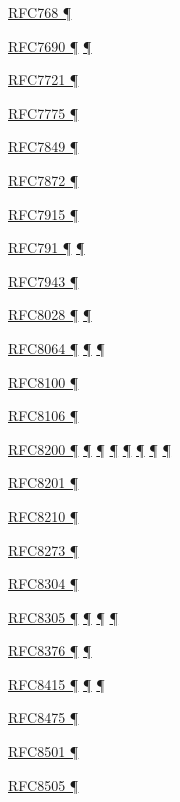\documentclass[
]{article}
\begin{document}
\hyperref[transport-protocols]{RFC768 ¶}

\hyperref[extension-headers-and-options]{RFC7690 ¶}
\hyperref[packet-size-and-jumbo-frames]{¶}

\hyperref[security-operation]{RFC7721 ¶}

\hyperref[routing]{RFC7775 ¶}

\hyperref[layer-2-considerations]{RFC7849 ¶}

\hyperref[extension-headers-and-options]{RFC7872 ¶}

\hyperref[translation-and-ipv4-as-a-service]{RFC7915 ¶}

\hyperref[why-version-6]{RFC791 ¶}
\hyperref[traffic-class-and-flow-label]{¶}

\hyperref[security-operation]{RFC7943 ¶}

\hyperref[auto-configuration]{RFC8028 ¶}
\hyperref[multi-prefix-operation]{¶}

\hyperref[addresses]{RFC8064 ¶} \hyperref[auto-configuration]{¶}
\hyperref[layer-2-functions]{¶}

\hyperref[traffic-class-and-flow-label]{RFC8100 ¶}

\hyperref[auto-configuration]{RFC8106 ¶}

\hyperref[how-to-keep-up-to-date]{RFC8200 ¶}
\hyperref[ipv6-basic-technology]{¶} \hyperref[address-resolution]{¶}
\hyperref[extension-headers-and-options]{¶} \hyperref[packet-format]{¶}
\hyperref[filtering]{¶} \hyperref[further-reading]{¶}
\hyperref[markdown-usage]{¶}

\hyperref[packet-size-and-jumbo-frames]{RFC8201 ¶}

\hyperref[filtering]{RFC8210 ¶}

\hyperref[prefix-per-host]{RFC8273 ¶}

\hyperref[transport-protocols]{RFC8304 ¶}

\hyperref[how-an-application-programmer-sees-ipv6]{RFC8305 ¶}
\hyperref[dual-stack-scenarios]{¶} \hyperref[multihoming]{¶}
\hyperref[deployment-in-the-home]{¶}

\hyperref[layer-2-functions]{RFC8376 ¶} \hyperref[energy-consumption]{¶}

\hyperref[managed-configuration]{RFC8415 ¶}
\hyperref[address-planning]{¶} \hyperref[prefix-per-host]{¶}

\hyperref[multi-prefix-operation]{RFC8475 ¶}

\hyperref[dns]{RFC8501 ¶}

\hyperref[address-resolution]{RFC8505 ¶}
\end{document}
